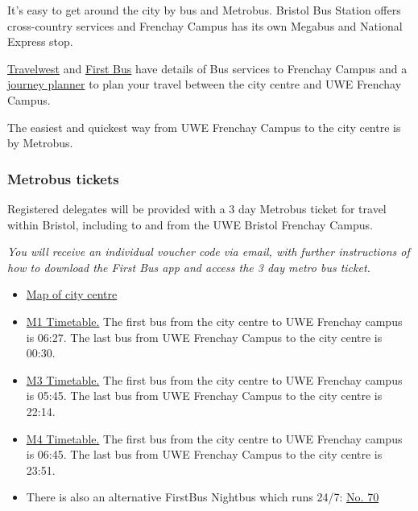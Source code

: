 \documentclass[12pt,a4paper]{article}
\begin{document}
It's easy to get around the city by bus and Metrobus. Bristol Bus Station offers cross-country services and Frenchay Campus has its own Megabus and National Express stop.

\href{https://travelwest.info/bus/services-to-university-of-bristol-and-uwe-campuses\#uwe}{Travelwest} and \href{https://www.firstbus.co.uk/bristol-bath-and-west/routes-and-maps/universities/uwe}{First Bus} have details of Bus services to Frenchay Campus and a \href{https://www.firstbus.co.uk/bristol-bath-and-west/plan-journey/journey-planner/}{journey planner} to plan your travel between the city centre and UWE Frenchay Campus.

The easiest and quickest way from UWE Frenchay Campus to the city centre is by Metrobus.

\subsubsection{Metrobus tickets}

Registered delegates will be provided with a 3 day Metrobus ticket for travel within Bristol, including to and from the UWE Bristol Frenchay Campus.

\emph{You will receive an individual voucher code via email, with further instructions of how to download the First Bus app and access the 3 day metro bus ticket.}

\begin{itemize}
\item \href{https://www.google.co.uk/maps/@51.4505229,-2.600453,17z}{Map of city centre}
\item \href{https://nationaljourneyplanner.travelinesw.com/swe-ttb/XSLT_TTB_REQUEST?language=en\&command=direct\&net=swe\&line=380m1\&sup=\%20\&project=y10\&outputFormat=0\&itdLPxx_displayHeader=false\&itdLPxx_sessionID=0\&lineVer=1}{M1 Timetable.} The first bus from the city centre to UWE Frenchay campus is 06:27. The last bus from UWE Frenchay Campus to the city centre is 00:30.
\item \href{http://nationaljourneyplanner.travelinesw.com/swe-ttb/XSLT_TTB_REQUEST?language=en\&command=direct\&net=swe\&line=380M3_\&sup=\%20\&project=y10\&outputFormat=0\&itdLPxx_displayHeader=false\&itdLPxx_sessionID=0\&lineVer=1}{M3 Timetable.} The first bus from the city centre to UWE Frenchay campus is 05:45. The last bus from UWE Frenchay Campus to the city centre is 22:14.
\item \href{https://nationaljourneyplanner.travelinesw.com/swe-ttb/XSLT_TTB_REQUEST?language=en\&command=direct\&net=swe\&line=380m4\&sup=\%20\&project=y10\&outputFormat=0\&itdLPxx_displayHeader=false\&itdLPxx_sessionID=0\&lineVer=1}{M4 Timetable.} The first bus from the city centre to UWE Frenchay campus is 06:45. The last bus from UWE Frenchay Campus to the city centre is 23:51.
\item There is also an alternative FirstBus Nightbus which runs 24/7: \href{http://nationaljourneyplanner.travelinesw.com/swe-ttb/XSLT_TTB_REQUEST?language=en\&command=direct\&net=swe\&line=38070_\&sup=\%20\&project=y10\&outputFormat=0\&itdLPxx_displayHeader=false\&itdLPxx_sessionID=0\&lineVer=1}{No. 70}
\end{itemize}
\end{document}
